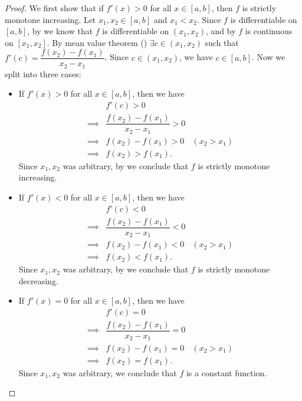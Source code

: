 \begin{proof}
  We first show that if \(f'(x) > 0\) for all \(x \in [a, b]\), then \(f\) is strictly monotone increasing.
  Let \(x_1, x_2 \in [a, b]\) and \(x_1 < x_2\).
  Since \(f\) is differentiable on \([a, b]\), by  we know that \(f\) is differentiable on \((x_1, x_2)\), and by  \(f\) is continuous on \([x_1, x_2]\).
  By mean value theorem () \(\exists c \in (x_1, x_2)\) such that \(f'(c) = \dfrac{f(x_2) - f(x_1)}{x_2 - x_1}\).
  Since \(c \in (x_1, x_2)\), we have \(c \in [a, b]\).
  Now we split into three cases:
  \begin{itemize}
    \item If \(f'(x) > 0\) for all \(x \in [a, b]\), then we have
          \begin{align*}
                     & f'(c) > 0                                            \\
            \implies & \dfrac{f(x_2) - f(x_1)}{x_2 - x_1} > 0               \\
            \implies & f(x_2) - f(x_1) > 0                    & (x_2 > x_1) \\
            \implies & f(x_2) > f(x_1).
          \end{align*}
          Since \(x_1, x_2\) was arbitrary, by  we conclude that \(f\) is strictly monotone increasing.
    \item If \(f'(x) < 0\) for all \(x \in [a, b]\), then we have
          \begin{align*}
                     & f'(c) < 0                                            \\
            \implies & \dfrac{f(x_2) - f(x_1)}{x_2 - x_1} < 0               \\
            \implies & f(x_2) - f(x_1) < 0                    & (x_2 > x_1) \\
            \implies & f(x_2) < f(x_1).
          \end{align*}
          Since \(x_1, x_2\) was arbitrary, by  we conclude that \(f\) is strictly monotone decreasing.
    \item If \(f'(x) = 0\) for all \(x \in [a, b]\), then we have
          \begin{align*}
                     & f'(c) = 0                                            \\
            \implies & \dfrac{f(x_2) - f(x_1)}{x_2 - x_1} = 0               \\
            \implies & f(x_2) - f(x_1) = 0                    & (x_2 > x_1) \\
            \implies & f(x_2) = f(x_1).
          \end{align*}
          Since \(x_1, x_2\) was arbitrary, we conclude that \(f\) is a constant function.
  \end{itemize}
\end{proof}

